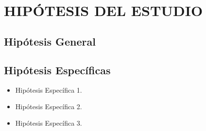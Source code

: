 \section{HIPÓTESIS DEL ESTUDIO}
	\subsection{Hipótesis General}
	
\lipsum[1]
	
	\subsection{Hipótesis Específicas}
\begin{itemize}
\item Hipótesis Específica 1.

\item Hipótesis Específica 2.

\item Hipótesis Específica 3.

\end{itemize}





